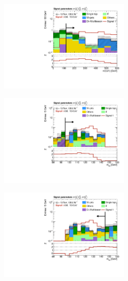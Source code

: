 \begin{figure}
\begin{subfigure}[b]{0.5\linewidth}
		\caption{}
	\end{subfigure}\hfill
	\begin{subfigure}[b]{0.5\linewidth}
		\centering\includegraphics[width=0.7\textwidth]{N-1_cut_scan/n1_800_150/mlb1}
		\caption{}
	\end{subfigure}\hfill
	\begin{subfigure}[b]{0.5\linewidth}
		\centering\includegraphics[width=0.7\textwidth]{N-1_cut_scan/n1_800_150/mbb_lower}
		\caption{}
	\end{subfigure}\hfill
	\begin{subfigure}[b]{0.5\linewidth}
		\centering\includegraphics[width=0.7\textwidth]{N-1_cut_scan/n1_800_150/mbb_upper}

\end{subfigure}
\end{figure}
